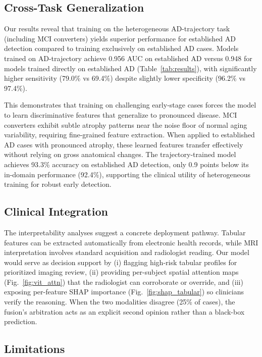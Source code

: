 \documentclass[conference]{IEEEtran}
\begin{document}
\subsection{Cross-Task Generalization}

Our results reveal that training on the heterogeneous AD-trajectory task (including MCI converters) yields superior performance for established AD detection compared to training exclusively on established AD cases. Models trained on AD-trajectory achieve 0.956 AUC on established AD versus 0.948 for models trained directly on established AD (Table~\ref{tab:results}), with significantly higher sensitivity (79.0\% vs 69.4\%) despite slightly lower specificity (96.2\% vs 97.4\%).

This demonstrates that training on challenging early-stage cases forces the model to learn discriminative features that generalize to pronounced disease. MCI converters exhibit subtle atrophy patterns near the noise floor of normal aging variability, requiring fine-grained feature extraction. When applied to established AD cases with pronounced atrophy, these learned features transfer effectively without relying on gross anatomical changes. The trajectory-trained model achieves 93.3\% accuracy on established AD detection, only 0.9 points below its in-domain performance (92.4\%), supporting the clinical utility of heterogeneous training for robust early detection.

\subsection{Clinical Integration}

The interpretability analyses suggest a concrete deployment pathway. Tabular features can be extracted automatically from electronic health records, while MRI interpretation involves standard acquisition and radiologist reading. Our model would serve as decision support by (i) flagging high-risk tabular profiles for prioritized imaging review, (ii) providing per-subject spatial attention maps (Fig.~\ref{fig:vit_attn}) that the radiologist can corroborate or override, and (iii) exposing per-feature SHAP importance (Fig.~\ref{fig:shap_tabular}) so clinicians verify the reasoning. When the two modalities disagree (25\% of cases), the fusion's arbitration acts as an explicit second opinion rather than a black-box prediction.

\subsection{Limitations}
\end{document}
